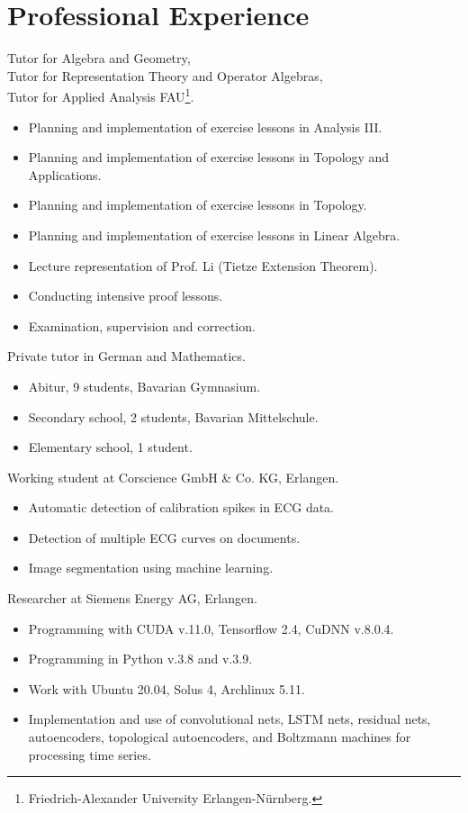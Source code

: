 \documentclass[a4paper, 12pt]{article}
\newcommand{\years}[1]{\marginnote{\scriptsize #1}}
\begin{document}
\section*{Professional Experience}
\years{2023--25} Tutor for Algebra and Geometry, \\
	      Tutor for Representation Theory and Operator Algebras, \\
	      Tutor for Applied Analysis FAU\footnote{Friedrich-Alexander University Erlangen-Nürnberg.}.
\begin{itemize}
	\item Planning and implementation of exercise lessons in \glqq Analysis III\grqq.
	\item Planning and implementation of exercise lessons in \glqq Topology and Applications\grqq.
	\item Planning and implementation of exercise lessons in \glqq Topology\grqq.
	\item Planning and implementation of exercise lessons in \glqq Linear Algebra\grqq.
	\item Lecture representation of Prof. Li (Tietze Extension Theorem).
	\item Conducting intensive proof lessons.
	\item Examination, supervision and correction.
\end{itemize}
\years{2024--25} Private tutor in German and Mathematics.
\begin{itemize}
	\item Abitur, 9 students, Bavarian Gymnasium.
	\item Secondary school, 2 students, Bavarian Mittelschule.
	\item Elementary school, 1 student.
\end{itemize}
\years{2021--22} Working student at Corscience GmbH \& Co. KG, Erlangen.
\begin{itemize}
	\item Automatic detection of calibration spikes in ECG data.
	\item Detection of multiple ECG curves on documents.
	\item Image segmentation using machine learning.
\end{itemize}
\years{2019--21} Researcher at Siemens Energy AG, Erlangen.
\begin{itemize}
	\item Programming with CUDA v.11.0, Tensorflow 2.4, CuDNN v.8.0.4.
	\item Programming in Python v.3.8 and v.3.9.
	\item Work with Ubuntu 20.04, Solus 4, Archlinux 5.11.
	\item Implementation and use of convolutional nets, LSTM nets, residual nets, autoencoders, topological autoencoders, and Boltzmann machines for processing time series.
\end{itemize}
\end{document}
